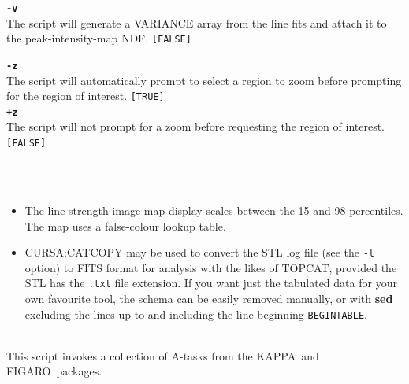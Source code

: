 \documentclass[twoside,11pt]{article}
\newcommand{\xref}[3]{#1}
\renewcommand{\_}{\texttt{\symbol{95}}}
\newcommand{\FIGARO}{{\footnotesize FIGARO}\normalsize}
\newcommand{\FIGAROref}{\xref{\FIGARO}{sun86}{}}
\newcommand{\KAPPA}{{\footnotesize KAPPA}\normalsize}
\newcommand{\KAPPAref}{\xref{\KAPPA}{sun95}{}}
\newcommand{\sstnotes}[1]{\item[Notes:] \mbox{} \\[1.3ex] #1}
\newcommand{\sstimplementationstatus}[1]{
   \item[{Implementation Status:}] \mbox{} \\[1.3ex] #1}
\newcommand{\ssthitemlist}[1]{
  \mbox{} \\
  \vspace{-8.0ex}
  \begin{itemize}
     #1
  \end{itemize}
}
\newcommand{\sstitem}{\item}
\newcommand{\sstnotes}[1]{\item[Notes:]
      \begin{description}
         #1
      \end{description}
   }
\newcommand{\sstimplementationstatus}[1]{\item[Implementation Status:]
      \begin{description}
         #1
      \end{description}
   }
\newcommand{\ssthitemlist}[1]{
      \begin{itemize}
         #1
      \end{itemize}
      \\
   }
\begin{document}
{{{         \sstitem
         {\bf{\tt{-v}}}\\
           The script will generate a \xref{VARIANCE}{sun95}{ap_NDFformat} array
           from the line fits and attach it to the peak-intensity-map NDF. {\tt [FALSE]}

         \sstitem
         {\bf{\tt{-z}}}\\
           The script will automatically prompt to select a region to
           zoom before prompting for the region of interest.  {\tt [TRUE]}\\
         {\bf{\tt{+z}}}\\
           The script will not prompt for a zoom before requesting the region
           of interest.  {\tt [FALSE]}
      }
   }
   \sstnotes{
      \ssthitemlist{

         \sstitem
         The line-strength image map display scales between the 15 and 98
         percentiles.  The map uses a false-colour lookup table.

         \sstitem
         \xref{CURSA:CATCOPY}{sun190}{COPY} may be used to convert the STL
         log file (see the {\tt -l} option) to FITS format for analysis with the
         likes of \xref{TOPCAT}{sun253}{}, provided the STL has
         the {\tt .txt} file extension.  If you want just the tabulated data for
         your own favourite tool, the schema can be easily removed manually,
         or with {\bf sed} excluding the lines up to and including the line beginning
         {\tt BEGINTABLE}.

      }
   }
   \sstimplementationstatus{
      This script invokes a collection of A-tasks from the \KAPPAref\
      and \FIGAROref\ packages.
   }
}
\newpage
\end{document}
